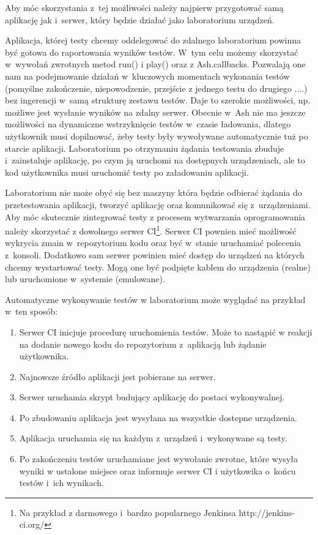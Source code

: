 \documentclass[brudnopis]{xmgr}
\begin{document}
Aby móc skorzystania z~tej możliwości należy najpierw przygotować samą aplikację jak i~serwer, który będzie działać jako laboratorium urządzeń. 

Aplikacja, której testy chcemy oddelegować do zdalnego laboratorium powinna być gotowa do raportowania wyników testów. W~tym celu możemy skorzystać w~wywołań zwrotnych metod run() i play() oraz z Ash.callbacks. Pozwalają one nam na podejmowanie działań w~kluczowych momentach wykonania testów (pomyślne zakończenie, niepowodzenie, przejście z jednego testu do drugiego ....) bez ingerencji w~samą strukturę zestawu testów. Daje to szerokie możliwości, np. możliwe jest wysłanie wyników na zdalny serwer. Obecnie w~Ash nie ma jeszcze możliwości na dynamiczne wstrzyknięcie testów w~czasie ładowania, dlatego użytkownik musi dopilnować, żeby testy były wywoływane automatycznie tuż po starcie aplikacji. Laboratorium po otrzymaniu żądania testowania zbuduje i~zainstaluje aplikację, po czym ją uruchomi na dostępnych urządzeniach, ale to kod użytkownika musi uruchomić testy po załadowaniu aplikacji.

Laboratorium nie może obyć się bez maszyny która będzie odbierać żądania do przetestowania aplikacji, tworzyć aplikację oraz komunikować się z~urządzeniami. Aby móc skutecznie zintegrować testy z procesem wytwarzania oprogramowania należy skorzystać z dowolnego serwer CI\footnote{ Na przykład z darmowego i~bardzo popularnego Jenkinsa http://jenkins-ci.org/}. Serwer CI pownien mieć możliwość wykrycia zmain w~repozytorium kodu oraz być w~stanie uruchamiać polecenia z~konsoli. Dodatkowo sam serwer powinien mieć dostęp do urządzeń na których chcemy wystartować testy. Mogą one być podpięte kablem do urządzenia (realne) lub uruchomione w~systemie (emulowane). 

Automatyczne wykonywanie testów w laboratorium może wyglądać na przykład w~ten sposób:

\begin{enumerate}
  \item Serwer CI inicjuje procedurę uruchomienia testów. Może to nastąpić w reakcji na dodanie nowego kodu do repozytorium z~aplikacją lub żądanie użytkownika.
  \item Najnowsze źródło aplikacji jest pobierane na serwer.
  \item Serwer uruchamia skrypt budujący aplikację do postaci wykonywalnej.
  \item Po zbudowaniu aplikacja jest wysyłana na wszystkie dostepne urządzenia.
  \item Aplikacja uruchamia się na każdym z~urządzeń i~wykonywane są testy.
  \item Po zakończeniu testów uruchamiane jest wywołanie zwrotne, które wysyła wyniki w ustalone miejsce oraz informuje serwer CI i użytkowika o~końcu testów i~ich wynikach.
\end{enumerate}
\end{document}
